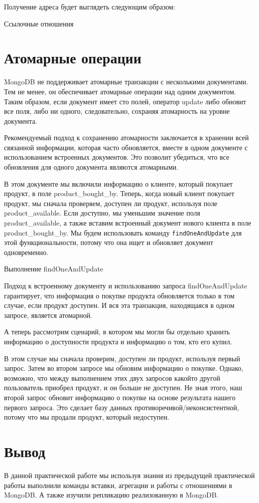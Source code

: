 Получение адреса будет выглядеть следующим образом:

\begin{image}
	\caption{Ссылочные отношения}
	\label{fig:link:relationship}
\end{image}

\section{Атомарные операции}

MongoDB не поддерживает атомарные транзакции с несколькими
документами. Тем не менее, он обеспечивает атомарные операции над одним
документом. Таким образом, если документ имеет сто полей, оператор update
либо обновит все поля, либо ни одного, следовательно, сохраняя атомарность
на уровне документа.\par
Рекомендуемый подход к сохранению атомарности заключается в
хранении всей связанной информации, которая часто обновляется, вместе в
одном документе с использованием встроенных документов. Это позволит
убедиться, что все обновления для одного документа являются атомарными.\par
В этом документе мы включили информацию о клиенте, который
покупает продукт, в поле product\_bought\_by. Теперь, когда новый клиент
покупает продукт, мы сначала проверяем, доступен ли продукт, используя
поле product\_available. Если доступно, мы уменьшим значение поля
product\_available, а также вставим встроенный документ нового клиента в поле
product\_bought\_by. Мы будем использовать команду \texttt{findOneAndUpdate}
для этой функциональности,
потому что она ищет и обновляет документ одновременно.

\begin{image}
	\caption{Выполнение findOneAndUpdate}
	\label{fig:findoneandupdate}
\end{image}

Подход к встроенному документу и использованию запроса
findOneAndUpdate гарантирует, что информация о покупке продукта обновляется
только в том случае, если продукт доступен. И вся эта транзакция, находящаяся
в одном запросе, является атомарной.\par
А теперь рассмотрим сценарий, в котором мы могли бы отдельно хранить
информацию о доступности продукта и информацию о том, кто его купил.\par
В этом случае мы сначала проверим, доступен ли продукт, используя
первый запрос. Затем во втором запросе мы обновим информацию о
покупке. Однако, возможно, что между выполнением этих двух запросов какойто другой пользователь приобрел продукт, и он больше не доступен. Не зная
этого, наш второй запрос обновит информацию о покупке на основе результата
нашего первого запроса. Это сделает базу данных
противоречивой/неконсистентной, потому что мы продали продукт, который
недоступен.

\clearpage

\section*{\LARGE Вывод}
В данной практической работе мы используя знания из
предыдущей практической работы выполнили команды вставки, агрегации
и работы с отношениями в MongoDB.
А также изучили репликацию реализованную в MongoDB.